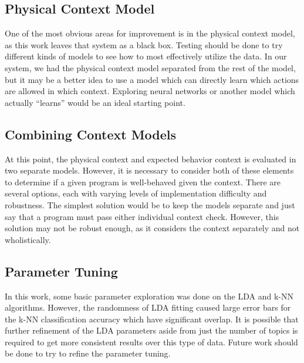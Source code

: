 \documentclass[../stegner_thesis.tex]{subfiles}
\begin{document}
\subsection{Physical Context Model}%
\label{sec:concl_physical_context}

\par One of the most obvious areas for improvement is in the physical context
model, as this work leaves that system as a black box.
Testing should be done to try different kinds of models to see how to most
effectively utilize the data.
In our system, we had the physical context model separated from the rest of the
model, but it may be a better idea to use a model which can directly learn
which actions are allowed in which context.
Exploring neural networks or another model which actually ``learns'' would be
an ideal starting point.

\subsection{Combining Context Models}%
\label{sec:concl_combining_context}

\par At this point, the physical context and expected behavior context is
evaluated in two separate models.
However, it is necessary to consider both of these elements to determine if a
given program is well-behaved given the context.
There are several options, each with varying levels of implementation
difficulty and robustness.
The simplest solution would be to keep the models separate and just say that
a program must pass either individual context check.
However, this solution may not be robust enough, as it considers the context
separately and not wholistically.

\subsection{Parameter Tuning}%
\label{sec:concl_parameter_tuning}

\par In this work, some basic parameter exploration was done on the LDA and
k-NN algorithms.
However, the randomness of LDA fitting caused large error bars for the k-NN
classification accuracy which have significant overlap.
It is possible that further refinement of the LDA parameters aside from just
the number of topics is required to get more consistent results over this type
of data.
Future work should be done to try to refine the parameter tuning.

\newpage
\end{document}

